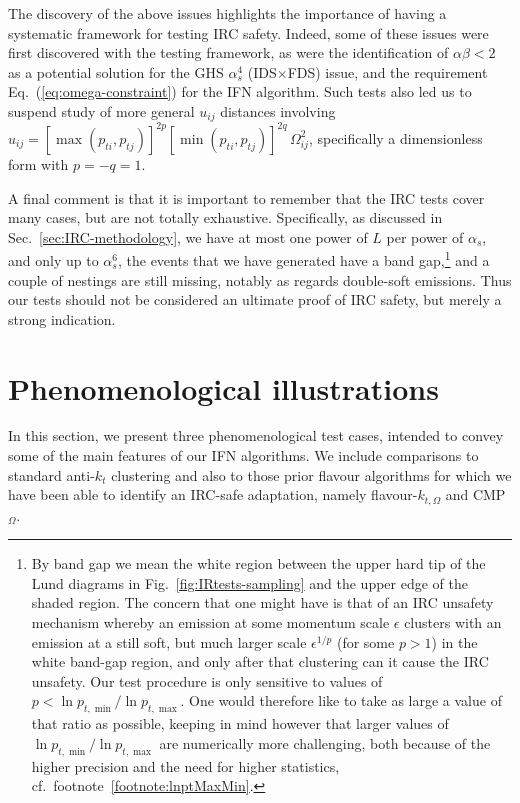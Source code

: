 \documentclass[nofootinbib,twocolumn,preprintnumbers,superscriptaddress,aps]{revtex4-2}
\newcommand{\as}{\alpha_s}
\newcommand{\lnptmin}{\ln p_{t,\min}}
\newcommand{\lnptmax}{\ln p_{t,\max}}
\begin{document}
The discovery of the above issues highlights the importance of having a
systematic framework for testing IRC safety.
%
Indeed, some of these issues 
were first discovered with the testing framework, as were
the identification of $\alpha \beta < 2$ as a potential solution for
the GHS $\as^4$ (IDS$\times$FDS) issue, and the requirement
Eq.~(\ref{eq:omega-constraint}) for the IFN algorithm.
%
Such tests also led us to suspend study of more general $u_{ij}$
distances involving
$u_{ij} = [\max(p_{ti},p_{tj})]^{2p} [\min(p_{ti},p_{tj})]^{2q}\,
\Omega_{ij}^2$, specifically a dimensionless form with $p=-q=1$.


A final comment is that it is important to remember that the IRC tests
cover many cases, but are not totally exhaustive.
%
Specifically, as
discussed in Sec.~\ref{sec:IRC-methodology}, we have at most one
power of $L$ per power of $\as$, and only up to $\as^6$, the events
that we have generated have a band gap,\footnote{By band gap we mean
  the white region between the upper hard tip of the Lund diagrams in
  Fig.~\ref{fig:IRtests-sampling} and the upper edge of the shaded
  region.
  The concern that one might have is that of an IRC unsafety mechanism
  whereby an emission at some momentum scale $\epsilon$ clusters with an
  emission at a still soft, but much larger scale $\epsilon^{1/p}$
  (for some $p>1$) in the white band-gap region, and only after that
  clustering can it cause the IRC unsafety.
  Our test procedure is only sensitive to values of $p <
  \lnptmin/\lnptmax$.
  One would therefore like to take as large a
  value of that ratio as possible, keeping in mind however that larger
  values of $\lnptmin/\lnptmax$ are numerically more challenging, both
  because of the higher precision and the need for higher statistics,
  cf.\ footnote~\ref{footnote:lnptMaxMin}. 
} and a couple of nestings are still missing,
notably as regards double-soft emissions.
%
Thus our tests should not be considered an ultimate proof of IRC
safety, but merely a strong indication.

\section{Phenomenological illustrations}
\label{sec:pheno}

In this section, we present three phenomenological test cases, intended
to convey some of the main features of our IFN algorithms.
%
We include comparisons to standard anti-$k_t$ clustering and also
to those prior flavour algorithms for which we have been able to identify
an IRC-safe adaptation, namely flavour-$k_{t,\Omega}$ and CMP$_\Omega$.
\end{document}
